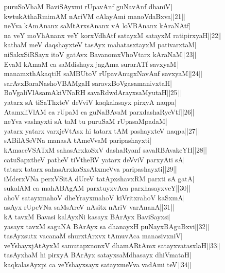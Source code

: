 \documentclass{article}
\begin{document}
puruSoVhaM BaviSAyxmi rUpavAnf guNavAnf dhaniV|\\
kwtukAthaRmimAM nAriVM cAlayAmi manoVdaBxva||21||\\
neYva kAmAnanx saMtArxsAnanx vA loVBAnanx kAraNAtf|\\
na veY moVhAnanx veY korxVdhAtf satayxM satayxM ratipirxyaH||22||\\
kathaM meV daqshayxteV tasAyx mahatasxtayxM pativarxtaM|\\
niSakxSiRSayx itoV gatAvx BavanomxVhoVtarx kAraNaM||23||\\
EvaM kAmaM ca saMdishayx jagAma surarATf savxyaM|\\
manamxthAkaqtiH saMBUtoV rUpavAnugxNavAnf savxyaM||24||\\
sarAvxBaraNashoVBAMgaH saravxBoVgasamanivxtaH|\\
BoVgaliVlAsamAkiVNaRH savaRdwdArayxsaMyutaH||25||\\
yatarx sA tiSaThxteV deVviV kaqkalasayx pirxyA naqpa|\\
AtamxliVlAM ca rUpaM ca guNaBAvaM parxdashaRyeVtf||26||\\
neYva vashayxti sA taM tu puruSaM rUpasaMpadaM|\\
yatarx yatarx varxjeVtAsx hi tatarx tAM pashayxteV naqpa||27||\\
sABilASeVNa manasA tAmeVvaM paripashayxti|\\
kAmaceVSATxM sahasArxkoSxV dashaRyanf savaRBAvakeYH||28||\\
catuSapxtheV patheV tiVtheRV yatarx deVviV parxyAti sA|\\
tatarx tatarx sahasArxkaSxsAtxmeVva paripashayxti||29||\\
iMderxVNa perxVSitA dUreV tatApxshavxRM parxti sA gatA|\\
sukalAM ca mahABAgAM parxtuyxvAca parxhasayxveY||30||\\
ahoV satayxmahoV dheYrayxmahoV kiVritxrahoV kaSxmA|\\
asAyx rUpeVNa saMsAreV nAsitx nAriV varAnanA||31||\\
kA tavxM Bavasi kalAyxNi kasayx BArAyx BaviSayxsi|\\
yasayx tavxM saguNA BArAyx sa dhanayxH puNayxBAguBxvi||32||\\
tasAyxsutx vacanaM shurxtArxvx tAmuvAca manasivxniV|\\
veYshayxjAtAyxM samutapxnonxV dhamARtAmx satayxvatasxlaH||33||\\
tasAyxhaM hi pirxyA BArAyx satayxsaMdhasayx dhiVmataH|\\
kaqkalasAyxpi ca veYshayxsayx satayxmeVva vadAmi teV||34||\\
\end{document}

